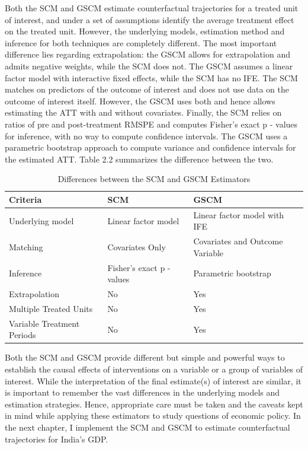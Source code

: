 \documentclass[12pt,nobind, a4paper]{reedthesis}
\begin{document}
 Both the SCM and GSCM estimate counterfactual trajectories for a treated unit of interest, and under a set of assumptions identify the average treatment effect on the treated unit. However, the underlying models, estimation method and inference for both techniques are completely different. The most important difference lies regarding extrapolation: the GSCM allows for extrapolation and admits negative weights, while the SCM does not. The GSCM assumes a linear factor model with interactive fixed effects, while the SCM has no IFE. The SCM matches on predictors of the outcome of interest and does not use data on the outcome of interest itself. However, the GSCM uses both and hence allows estimating the ATT with and without covariates. Finally, the SCM relies on ratios of pre and post-treatment RMSPE and computes Fisher's exact p - values for inference, with no way to compute confidence intervals. The GSCM uses a parametric bootstrap approach to compute variance and confidence intervals for the estimated ATT. Table 2.2 summarizes the difference between the two.
 \begin{table}[h!!]
 \centering
 \begin{tabular}{lll}
 \hline
 \hline
 \textbf{Criteria} & \textbf{SCM}&\textbf{GSCM}\\
 \hline
 \hline
 Underlying model & Linear factor model & Linear factor model with IFE\\
 Matching & Covariates Only & Covariates and Outcome Variable\\
 Inference & Fisher's exact p - values & Parametric bootstrap\\
 Extrapolation&No&Yes\\
 Multiple Treated Units & No & Yes\\
 Variable Treatment Periods&No&Yes\\
 \hline
 \end{tabular}
 \caption{Differences between the SCM and GSCM Estimators}
 \end{table}
 \linebreak

 Both the SCM and GSCM provide different but simple and powerful ways to establish the causal effects of interventions on a variable or a group of variables of interest. While the interpretation of the final estimate(s) of interest are similar, it is important to remember the vast differences in the underlying models and estimation strategies. Hence, appropriate care must be taken and the caveats kept in mind while applying these estimators to study questions of economic policy. In the next chapter, I implement the SCM and GSCM to estimate counterfactual trajectories for India's GDP.
\end{document}
